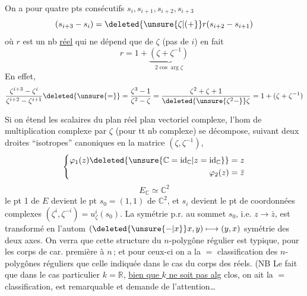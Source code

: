 On a pour quatre pts consécutifs $s_i,s_{i+1},s_{i+2},s_{i+3}$
\[
(s_{i+3}-s_i)=\deleted{\unsure{\zeta|(+}}r(s_{i+2}-s_{i+1})
\]
où $r$ est un nb \uline{réel} qui ne dépend
que de $\zeta$ (pas de $i$) en fait
\[
r=1+\underbrace{(\zeta+\zeta^{-1})}_{2\cos\arg\zeta}
\]
En effet,
\[
\frac{\zeta^{i+3}-\zeta^i}{\zeta^{i+2}-\zeta^{i+1}}\deleted{\unsure{=}}=
\frac{\zeta^3-1}{\zeta^2-\zeta}=
\frac{\zeta^2+\zeta+1}{\deleted{\unsure{\zeta^2-}}\zeta}=1+(\zeta+\zeta^{-1})
\]

Si on étend les scalaires du plan  réel
 plan vectoriel complexe, l'hom  de
multiplication complexe par $\zeta$ (pour tt nb
complexe) se décompose, suivant deux
droites ``isotropes'' canoniques en
la matrice  $(\zeta,\zeta^{-1})$,
\[
\left\{\begin{aligned}
\varphi_1(z)\deleted{\unsure{\mathbb C=\mathrm{id}_{\mathbb C}|z=\mathrm{id}_{\mathbb C}}}&=z\\
\varphi_2(z)&=\bar z
\end{aligned}\right.
\]
\[
E_{\mathbb C}\simeq\mathbb C^2
\]
le pt 1 de $E$ devient
le pt $s_0=(1,1)$ de $\mathbb C^2$,
et $s_i$ devient le pt de coordonnées
complexes $(\zeta^i,\zeta^{-i})=u_\zeta^i(s_0)$. La symétrie
p.r. au sommet $s_0$, i.e. $z\longrightarrow\bar z$, est
transformé en l'autom $(\deleted{\unsure{-|x}}x,y)\longmapsto(y,x)$
symétrie des deux axes. On verra que
cette structure du $n$-polygône régulier
est typique, pour les corps  de car.
première à $n$\,; et pour ceux-ci on a la $=$
classification des $n$-polygônes réguliers  que
celle indiquée dans le cas du corps des
réels. (NB Le fait que dans le cas
particulier $k=\mathbb R$, \uline{bien que $k$ ne soit pas
alg} clos, on ait la $=$ classification, est
remarquable et demande de l'attention\ldots

